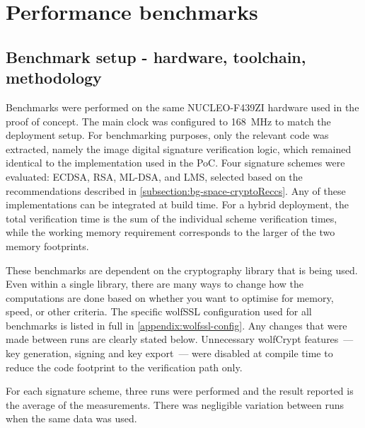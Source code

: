 \section{Performance benchmarks}
\label{section:eval-benchmarks}

\subsection{Benchmark setup - hardware, toolchain, methodology}
\label{subsection:eval-benchmarks-setup}

Benchmarks were performed on the same NUCLEO-F439ZI hardware used in the proof of concept. The main clock was configured to 168~MHz to match the deployment setup. For benchmarking purposes, only the relevant code was extracted, namely the image digital signature verification logic, which remained identical to the implementation used in the PoC. Four signature schemes were evaluated: ECDSA, RSA, ML-DSA, and LMS, selected based on the recommendations described in \autoref{subsection:bg-space-cryptoReccs}. Any of these implementations can be integrated at build time. For a hybrid deployment, the total verification time is the sum of the individual scheme verification times, while the working memory requirement corresponds to the larger of the two memory footprints.

These benchmarks are dependent on the cryptography library that is being used. Even within a single library, there are many ways to change how the computations are done based on whether you want to optimise for memory, speed, or other criteria. The specific wolfSSL configuration used for all benchmarks is listed in full in \autoref{appendix:wolfssl-config}. Any changes that were made between runs are clearly stated below. Unnecessary wolfCrypt features~--- key generation, signing and key export~--- were disabled at compile time to reduce the code footprint to the verification path only.

For each signature scheme, three runs were performed and the result reported is the average of the measurements. There was negligible variation between runs when the same data was used. 

